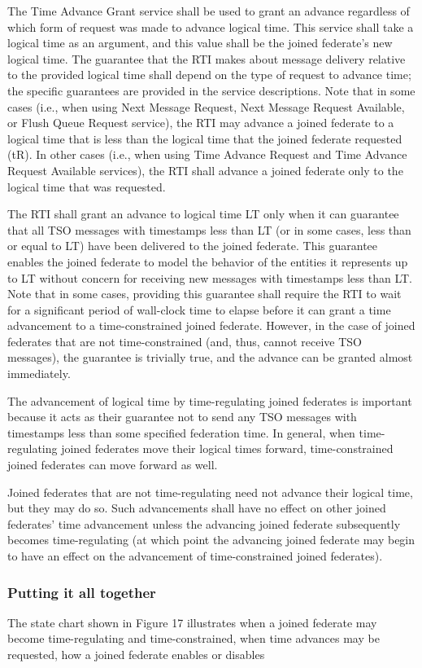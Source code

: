 \begin{compactstdpage}
    The Time Advance Grant \rtiinitiated{} service shall be used to grant an advance regardless of which form of request was made to advance logical time. This service shall take a logical time as an argument, and this value shall be the joined federate's new logical time. The guarantee that the RTI makes about message delivery relative to the provided logical time shall depend on the type of request to advance time; the specific guarantees are provided in the service descriptions. Note that in some cases (i.e., when using Next Message Request, Next Message Request Available, or Flush Queue Request service), the RTI may advance a joined federate to a logical time that is less than the logical time that the joined federate requested (tR). In other cases (i.e., when using Time Advance Request and Time Advance Request Available services), the RTI shall advance a joined federate only to the logical time that was requested.

    The RTI shall grant an advance to logical time LT only when it can guarantee that all TSO messages with timestamps less than LT (or in some cases, less than or equal to LT) have been delivered to the joined federate. This guarantee enables the joined federate to model the behavior of the entities it represents up to LT without concern for receiving new messages with timestamps less than LT. Note that in some cases, providing this guarantee shall require the RTI to wait for a significant period of wall-clock time to elapse before it can grant a time advancement to a time-constrained joined federate. However, in the case of joined federates that are not time-constrained (and, thus, cannot receive TSO messages), the guarantee is trivially true, and the advance can be granted almost immediately.

    The advancement of logical time by time-regulating joined federates is important because it acts as their guarantee not to send any TSO messages with timestamps less than some specified federation time. In general, when time-regulating joined federates move their logical times forward, time-constrained joined federates can move forward as well.

    Joined federates that are not time-regulating need not advance their logical time, but they may do so. Such advancements shall have no effect on other joined federates' time advancement unless the advancing joined federate subsequently becomes time-regulating (at which point the advancing joined federate may begin to have an effect on the advancement of time-constrained joined federates).

    \subsubsection{Putting it all together}

    The state chart shown in Figure 17 illustrates when a joined federate may become time-regulating and time-constrained, when time advances may be requested, how a joined federate enables or disables


\end{compactstdpage}


